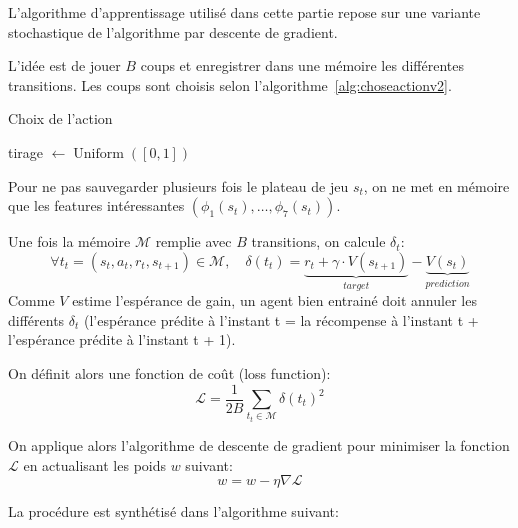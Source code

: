 \documentclass{report}
\DeclareMathOperator{\argmax}{argmax}
\DeclareMathOperator{\uniform}{Uniform}
\begin{document}
L'algorithme d'apprentissage utilisé dans cette partie repose sur une variante
stochastique de l'algorithme par descente de gradient.

L'idée est de jouer \( B \) coups et enregistrer dans une mémoire les différentes
transitions. Les coups sont choisis selon l'algorithme~\ref{alg:choseactionv2}.

\begin{algorithm}[h]
  \caption{Choix de l'action}\label{alg:choseactionv2}
  \begin{algorithmic}
    [1]
    \State{} tirage \(\gets \uniform([0, 1])\)
    \State{}\Return{\(\argmax_{{a_t}\in\mathcal{A}} [r_t + \gamma V(s_{t+1})] \)}
    \\ 
    \Else{}
    \State{}\Return{\(\uniform(\mathcal{A})\)}
    \EndIf{}
    \EndProcedure{}
  \end{algorithmic}
\end{algorithm}

Pour ne pas sauvegarder plusieurs fois le plateau de jeu \(s_t\), on ne met en
mémoire que les features intéressantes \( (\phi_1 (s_t), \hdots, \phi_7(s_t)) \).

Une fois la mémoire \( \mathcal{M} \) remplie avec \( B \) transitions, on
calcule \(\delta_t\):
\[
\forall t_t = (s_t, a_t, r_t, s_{t+1}) \in \mathcal{M},\quad
\delta(t_t) = \underbrace{r_t + \gamma \cdot V(s_{t+1})}_{target} -
\underbrace{V(s_{t})}_{prediction}
\]
Comme \( V \) estime l'espérance de gain, un agent bien entrainé doit annuler
les différents \(\delta_t\) (l'espérance prédite à l'instant t = la récompense
à l'instant t + l'espérance prédite à l'instant t + 1).

On définit alors une fonction de coût (loss function):
\[
\mathcal{L} = \frac{1}{2B} \sum _{t_t \in \mathcal{M}} \delta(t_t)^2
\]

On applique alors l'algorithme de descente de gradient pour minimiser la fonction
\( \mathcal{L} \) en actualisant les poids \( w \) suivant:
\[
w = w - \eta \nabla \mathcal{L}
\]

La procédure est synthétisé dans l'algorithme suivant:
\end{document}
